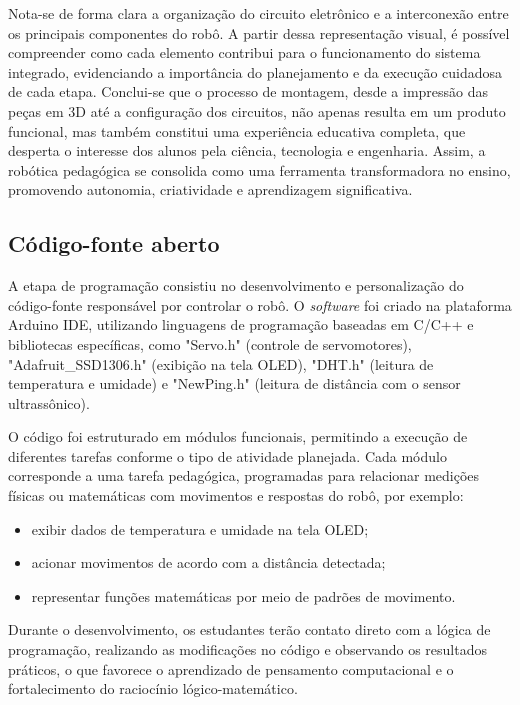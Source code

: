 \documentclass[portuguese]{textolivre}
\begin{document}
Nota-se de forma clara a organização do circuito eletrônico e a interconexão entre os principais componentes do robô. A partir dessa representação visual, é possível compreender como cada elemento contribui para o funcionamento do sistema integrado, evidenciando a importância do planejamento e da execução cuidadosa de cada etapa. Conclui-se que o processo de montagem, desde a impressão das peças em 3D até a configuração dos circuitos, não apenas resulta em um produto funcional, mas também constitui uma experiência educativa completa, que desperta o interesse dos alunos pela ciência, tecnologia e engenharia. Assim, a robótica pedagógica se consolida como uma ferramenta transformadora no ensino, promovendo autonomia, criatividade e aprendizagem significativa.

\subsection{Código-fonte aberto}

A etapa de programação consistiu no desenvolvimento e personalização do código-fonte responsável por controlar o robô. O \textit{software} foi criado na plataforma Arduino IDE, utilizando linguagens de programação baseadas em C/C++ e bibliotecas específicas, como "Servo.h" (controle de servomotores), "Adafruit\_SSD1306.h" (exibição na tela OLED), "DHT.h" (leitura de temperatura e umidade) e "NewPing.h" (leitura de distância com o sensor ultrassônico).

O código foi estruturado em módulos funcionais, permitindo a execução de diferentes tarefas conforme o tipo de atividade planejada. Cada módulo corresponde a uma tarefa pedagógica, programadas para relacionar medições físicas ou matemáticas com movimentos e respostas do robô, por exemplo:

\begin{itemize}
	\item exibir dados de temperatura e umidade na tela OLED;
	\item acionar movimentos de acordo com a distância detectada;
	\item representar funções matemáticas por meio de padrões de movimento.
\end{itemize}

Durante o desenvolvimento, os estudantes terão contato direto com a lógica de programação, realizando as modificações no código e observando os resultados práticos, o que favorece o aprendizado de pensamento computacional e o fortalecimento do raciocínio lógico-matemático.
\end{document}
